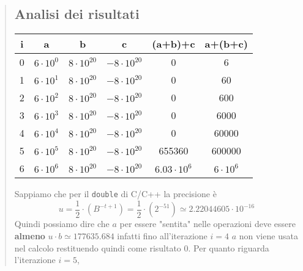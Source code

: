 \documentclass[10pt]{article}
\begin{document}
\begin{quote}
    \subsection{Analisi dei risultati}
    \begin{center}
        \begin{tabular}{| c | c | c | c | c | c |}
            \hline
            \textbf{i} & \textbf{a} & \textbf{b} & \textbf{c} & \textbf{(a+b)+c} & \textbf{a+(b+c)} \\
            \hline
            0 &$6\cdot 10^{0}$  & $8 \cdot 10^{20}$ & $-8 \cdot 10^{20}$ & 0 & 6\\
            \hline
            1 &$6\cdot 10^{1}$ & $8 \cdot 10^{20}$ & $-8 \cdot 10^{20}$ & 0 & 60\\
            \hline
            2 &$6\cdot 10^{2}$ & $8 \cdot 10^{20}$ & $-8 \cdot 10^{20}$ & 0 & 600\\
            \hline
            3 &$6\cdot 10^{3}$ & $8 \cdot 10^{20}$ & $-8 \cdot 10^{20}$ & 0 & 6000\\
            \hline
            4 &$6\cdot 10^{4}$ & $8 \cdot 10^{20}$ & $-8 \cdot 10^{20}$ & 0 & 60000\\
            \hline
            5 &$6\cdot 10^{5}$ & $8 \cdot 10^{20}$ & $-8 \cdot 10^{20}$ & 655360 & 600000\\
            \hline
            6 &$6\cdot 10^{6}$ & $8 \cdot 10^{20}$ & $-8 \cdot 10^{20}$ & $6.03\cdot 10^{6}$ & $6\cdot 10^{6}$ \\
            \hline
        \end{tabular}
    \end{center}
    Sappiamo che per il \texttt{double} di C/C++ la precisione è
    \begin{equation*}
        u=\frac{1}{2}\cdot\left(B^{-t+1}\right) = \frac{1}{2}\cdot\left(2^{-51}\right) \simeq 2.22044605\cdot 10^{-16}  
    \end{equation*}
    Quindi possiamo dire che $a$ per essere "sentita" nelle operazioni deve essere \textbf{almeno} $u\cdot b\simeq 177635.684$ infatti fino all'iterazione $i=4$ $a$ non viene usata nel calcolo restituendo quindi come risultato 0. Per quanto riguarda l'iterazione $i=5$, 
\end{quote}
\newpage
\end{document}
